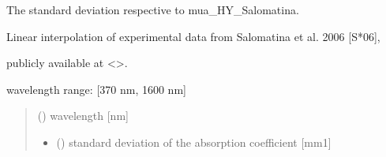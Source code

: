 \documentclass[letterpaper,10pt,english]{sphinxmanual}
\begin{document}
\begin{fulllineitems}
\label{\detokenize{03_absorption_coefficient:skinoptics.absorption_coefficient.std_mua_HY_Salomatina}}
\pysigstartsignatures
{}
\pysigstopsignatures
\begin{DUlineblock}{0em}
\item[] The standard deviation respective to mua\_HY\_Salomatina.
\item[] Linear interpolation of experimental data from Salomatina et al. 2006 {[}S*06{]},
\item[] publicly available at \textless{}\textgreater{}.
\end{DUlineblock}

\begin{DUlineblock}{0em}
\item[] wavelength range: {[}370 nm, 1600 nm{]}
\end{DUlineblock}
\begin{quote}\begin{description}
\sphinxAtStartPar
{} () \textendash{} wavelength {[}nm{]}

\sphinxAtStartPar
\begin{itemize}
\item {} 
\sphinxAtStartPar
{} () \textendash{} standard deviation of the absorption coefficient {[}mm\sphinxhyphen{}1{]}

\end{itemize}


\end{description}\end{quote}

\end{fulllineitems}


\sphinxstepscope
\end{document}
